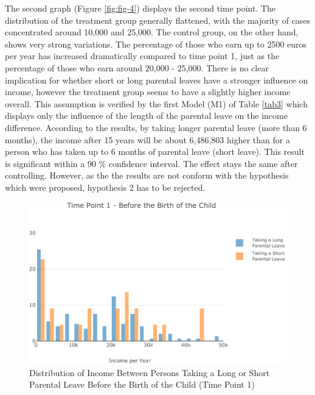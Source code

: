 \documentclass[
  12pt,
]{article}
\begin{document}
The second graph (Figure \ref{fig:fig-4}) displays the second time point. The distribution of the treatment group generally flattened, with the majority of cases concentrated around 10,000 and 25,000. The control group, on the other hand, shows very strong variations. The percentage of those who earn up to 2500 euros per year has increased dramatically compared to time point 1, just as the percentage of those who earn around 20,000 - 25,000. There is no clear implication for whether short or long parental leaves have a stronger influence on income, however the treatment group seems to have a slightly higher income overall.
This assumption is verified by the first Model (M1) of Table \ref{tab3} which displays only the influence of the length of the parental leave on the income difference. According to the results, by taking longer parental leave (more than 6 months), the income after 15 years will be about 6,486,803 higher than for a person who has taken up to 6 months of parental leave (short leave). This result is significant within a 90 \% confidence interval. The effect stays the same after controlling. However, as the the results are not conform with the hypothesis which were proposed, hypothesis 2 has to be rejected.

\begin{figure}

{\centering \includegraphics{Parental_Leave-Finalizing-Data-Set_files/figure-latex/fig-3-1} 

}

\caption{Distribution of Income Between Persons Taking a Long or Short Parental Leave Before the Birth of the Child (Time Point 1)}\label{fig:fig-3}
\end{figure}
\end{document}
